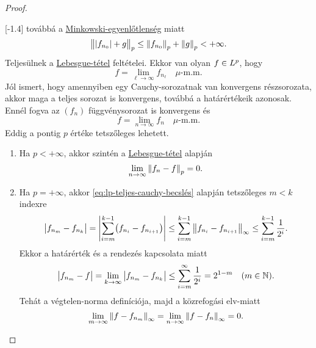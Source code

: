 \documentclass[
]{elteikthesis}[2024/04/26]
\begin{document}
\begin{proof}
{\begin{theo*}
			\end{theo*}
		}[-1.4\baselineskip]
		továbbá a \hyperref[th:minkowski]{Minkowski-egyenlőtlenség} miatt
		\[
			\norm\big{ \abs{ f_{n_0} } + g }_p \leq 
			\norm{ f_{n_0} }_p + \norm{g}_p < +\infty.
		\]
		Teljesülnek a \hyperref[th:lebesgue]{Lebesgue-tétel} feltételei.
		Ekkor van olyan	\( f \in \Lebesgue[p] \), hogy
		\[
			f = \lim_{\ell \to \infty} f_{n_\ell} \quad \mu \text{-m.m.}
		\]
		Jól ismert, hogy amennyiben egy Cauchy-sorozatnak van konvergens részsorozata, 
		akkor maga a teljes sorozat is konvergens, továbbá a határértékeik azonosak.
		Ennél fogva az \( (f_n) \) függvénysorozat is konvergens és
		\[
			f = \lim_{n \to \infty} f_n \quad \mu \text{-m.m.}
		\]
		Eddig a pontig \( p \) értéke tetszőleges lehetett.
		
		
		\begin{enumerate}
			\item Ha \( p < +\infty \), 
			akkor szintén a \hyperref[th:lebesgue]{Lebesgue-tétel} alapján
			\[
				\lim_{n \to \infty} \norm{ f_n - f}_p = 0.
			\]
			
			\item Ha \( p = +\infty \),
			akkor \eqref{eq:lp-teljes-cauchy-becslés} alapján tetszőleges \( m < k \) indexre
			\[
				\abs\big{ f_{n_m} - f_{n_k} } =
				\abs{ \sum_{i=m}^{k - 1} \bigl( f_{n_i} - f_{n_{i + 1}} \bigr) } \leq
				\sum_{i=m}^{k - 1} \norm\big{ f_{n_i} - f_{n_{i + 1}} }_\infty \leq
				\sum_{i=m}^{k - 1} \frac{1}{2^i}.
			\]
			Ekkor a határérték és a rendezés kapcsolata miatt
			\[
				\abs\big{ f_{n_m} - f } =
				\lim_{k \to \infty} \abs\big{ f_{n_m} - f_{n_k} } \leq
				\sum_{i=m}^{\infty} \frac{1}{2^i} =
				2^{1-m}
				\quad (m \in \mathbb{N}).
			\]
			Tehát a végtelen-norma definíciója, majd a közrefogási elv-miatt
			\[
				\lim_{m \to \infty} \norm{ f - f_{n_m} }_\infty =
				\lim_{n \to \infty} \norm{ f - f_n }_\infty =
				0.
			\]
		\end{enumerate}
		
	\end{proof}
	
\end{document}
